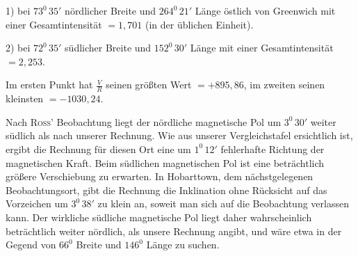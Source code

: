 1) bei $73^0\,35'$ nördlicher Breite und $264^0\,21'$ Länge östlich von Greenwich mit einer Gesamtintensität $=1{,}701$ (in der üblichen Einheit).

2) bei $72^0\,35'$ südlicher Breite und $152^0\,30'$ Länge mit einer Gesamtintensität $=2{,}253$.

Im ersten Punkt hat $\frac VR$ seinen größten Wert $=+895{,}86$, im zweiten seinen kleinsten $=-1030{,}24$.

Nach \textsc{Ross}’ Beobachtung liegt der nördliche magnetische Pol um $3^0\,30'$ weiter südlich als nach unserer Rechnung. Wie aus unserer Vergleichstafel ersichtlich ist, ergibt die Rechnung für diesen Ort eine um $1^0\,12'$ fehlerhafte Richtung der magnetischen Kraft. Beim südlichen magnetischen Pol ist eine beträchtlich größere Verschiebung zu erwarten. In Hobarttown, dem nächstgelegenen Beobachtungsort, gibt die Rechnung die Inklination ohne Rücksicht auf das Vorzeichen um $3^0\,38'$ zu klein an, soweit man sich auf die Beobachtung verlassen kann. Der wirkliche südliche magnetische Pol liegt daher wahrscheinlich beträchtlich weiter nördlich, als unsere Rechnung angibt, und wäre etwa in der Gegend von $66^0$ Breite und $146^0$ Länge zu suchen.

